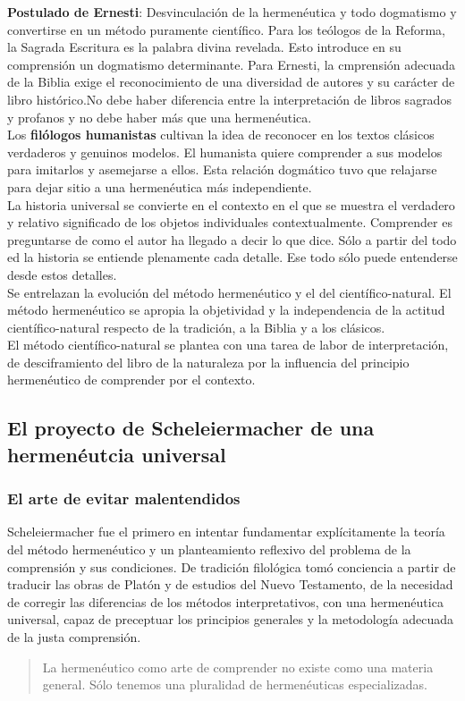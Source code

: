 \documentclass[a4paper, 11pt, twocolumn, spanish]{article}
\begin{document}
\textbf{Postulado de Ernesti}: Desvinculación de la hermenéutica y todo
dogmatismo y convertirse en un método puramente científico. Para los
teólogos de la Reforma, la Sagrada Escritura es la palabra divina
revelada. Esto introduce en su comprensión un dogmatismo
determinante. Para Ernesti, la cmprensión adecuada de la Biblia exige
el reconocimiento de una diversidad de autores y su carácter de libro
histórico.No debe haber diferencia entre la interpretación de libros
sagrados y profanos y no debe haber más que una hermenéutica.\\[0pt]

Los \textbf{filólogos humanistas} cultivan la idea de reconocer en los textos
clásicos verdaderos y genuinos modelos. El humanista quiere comprender
a sus modelos para imitarlos y asemejarse a ellos. Esta relación
dogmático tuvo que relajarse para dejar sitio a una hermenéutica más
independiente.\\[0pt]

La historia universal se convierte en el contexto en el que se muestra
el  verdadero  y  relativo  significado de  los  objetos  individuales
contextualmente. Comprender es preguntarse de como el autor ha llegado
a decir lo que dice. Sólo a partir del todo ed la historia se entiende
plenamente cada  detalle. Ese todo  sólo puede entenderse  desde estos
detalles.\\[0pt]


Se entrelazan la evolución del método hermenéutico y el del
científico-natural. El método hermenéutico se apropia la objetividad y
la independencia de la actitud científico-natural respecto de la
tradición, a la Biblia y a los clásicos.\\[0pt]
El método científico-natural se plantea con una tarea de labor de
interpretación, de desciframiento del libro de la naturaleza por la
influencia del principio hermenéutico de comprender por el contexto.

\subsection{El proyecto de Scheleiermacher de una hermenéutcia universal}
\label{sec:org8a14aa4}
\subsubsection{El arte de evitar malentendidos}
\label{sec:orga984e9f}
Scheleiermacher fue el primero en intentar fundamentar explícitamente
la teoría del método hermenéutico y un planteamiento reflexivo del
problema de la comprensión y sus condiciones. De tradición filológica
tomó conciencia a partir de traducir las obras de Platón y de estudios
del Nuevo Testamento, de la necesidad de corregir las diferencias de
los métodos interpretativos, con una hermenéutica universal, capaz de
preceptuar los principios generales y la metodología adecuada de la
justa comprensión.
\begin{quote}
La hermenéutico como arte de comprender no existe como una materia
general. Sólo tenemos una pluralidad de hermenéuticas especializadas.
\end{quote}
\end{document}
